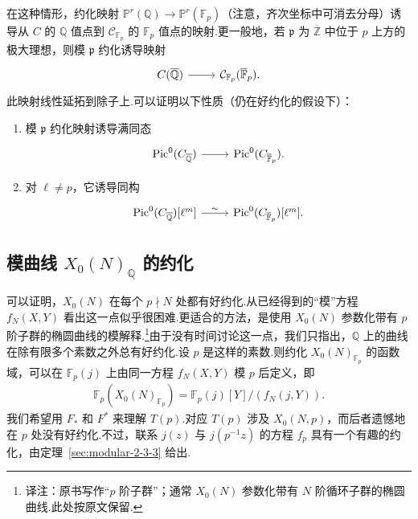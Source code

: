 在这种情形，约化映射 $\mathbb P^r(\mathbb Q)\longrightarrow\mathbb P^r(\mathbb F_p)$（注意，齐次坐标中可消去分母）诱导从 $C$ 的 $\mathbb Q$ 值点到 $\mathcal C_{\mathbb F_p}$ 的 $\mathbb F_p$ 值点的映射.更一般地，若 $\mathfrak p$ 为 $\overline{\mathbb Z}$ 中位于 $p$ 上方的极大理想，则模 $\mathfrak p$ 约化诱导映射
\begin{equation*}
\begin{tikzcd}
C(\overline{\mathbb Q}) \arrow[r] & \mathcal C_{\mathbb F_p}(\overline{\mathbb F}_p).
\end{tikzcd}
\end{equation*}
此映射线性延拓到除子上.可以证明以下性质（仍在好约化的假设下）：

\begin{enumerate}[label=\roman*)]

\item 模 $\mathfrak p$ 约化映射诱导满同态
\begin{equation*}
\begin{tikzcd}
\operatorname{Pic}^0(C_{\overline{\mathbb Q}}) \arrow[r] & \operatorname{Pic}^0(C_{\overline{\mathbb F}_p}).
\end{tikzcd}
\end{equation*}
\item 对 $\ell\ne p$，它诱导同构
\begin{equation*}
\begin{tikzcd}
\operatorname{Pic}^0(C_{\overline{\mathbb Q}})[\ell^m] \arrow[r,"\sim"] & \operatorname{Pic}^0(C_{\overline{\mathbb F}_p})[\ell^m].
\end{tikzcd}
\end{equation*}
\end{enumerate}



\subsection{模曲线 \texorpdfstring{$X_0(N)_{\mathbb Q}$}{X₀(N) 在Q上} 的约化}\label{sec:modular-2-4-4}

可以证明，$X_0(N)$ 在每个 $p\nmid N$ 处都有好约化.从已经得到的``模''方程 $f_N(X,Y)$ 看出这一点似乎很困难.更适合的方法，是使用 $X_0(N)$ 参数化带有 $p$ 阶子群的椭圆曲线的模解释.\footnote{译注：原书写作``$p$ 阶子群''；通常 $X_0(N)$ 参数化带有 $N$ 阶循环子群的椭圆曲线.此处按原文保留.}由于没有时间讨论这一点，我们只指出，$\mathbb Q$ 上的曲线在除有限多个素数之外总有好约化.设 $p$ 是这样的素数.则约化 $X_0(N)_{\mathbb F_p}$ 的函数域，可以在 $\mathbb F_p(j)$ 上由同一方程 $f_N(X,Y)$ 模 $p$ 后定义，即
\begin{align*}
\mathbb F_p(X_0(N)_{\mathbb F_p})=\mathbb F_p(j)[Y]/(f_N(j,Y)).
\end{align*}
我们希望用 $F_*$ 和 $F^*$ 来理解 $T(p)$.对应 $T(p)$ 涉及 $X_0(N,p)$，而后者遗憾地在 $p$ 处没有好约化.不过，联系 $j(z)$ 与 $j(p^{-1}z)$ 的方程 $f_p$ 具有一个有趣的约化，由定理~\ref{sec:modular-2-3-3} 给出.



